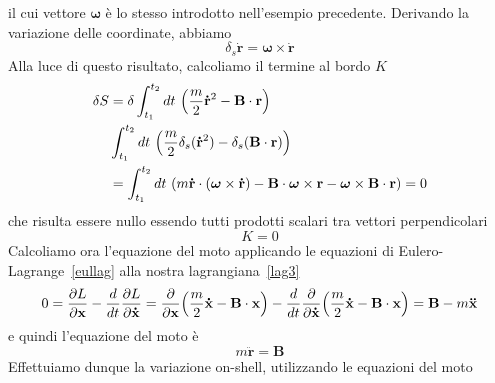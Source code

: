 \begin{example}
\begin{equation}
    \end{equation}
        il cui vettore $\boldsymbol \omega$ è lo stesso introdotto nell'esempio precedente. Derivando la variazione delle coordinate, abbiamo
    \begin{equation}
        \delta_s \mathbf{\dot r} = \boldsymbol \omega \times \mathbf{\dot r}
    \end{equation}
        Alla luce di questo risultato, calcoliamo il termine al bordo $K$ 
    \begin{equation*}
    \begin{aligned}
        \delta S & = \delta \int_{t_1}^{t_2}dt~ \Big( \frac{m}{2} \mathbf{\dot r}^2 - \mathbf B \cdot \mathbf r \Big) \\ & \int_{t_1}^{t_2}dt~ \Big( \frac{m}{2} \delta_s (\mathbf{\dot r}^2) - \delta_s (\mathbf B \cdot \mathbf r ) \Big ) \\ & = \int_{t_1}^{t_2}dt~ (m \mathbf{\dot r} \cdot (\boldsymbol \omega \times \mathbf{\dot r} ) - \mathbf B \cdot \boldsymbol \omega \times \mathbf r - \boldsymbol \omega \times \mathbf B \cdot \mathbf r ) = 0
    \end{aligned}
    \end{equation*}
        che risulta essere nullo essendo tutti prodotti scalari tra vettori perpendicolari
    \begin{equation*}
        K = 0
    \end{equation*}
        Calcoliamo ora l'equazione del moto applicando le equazioni di Eulero-Lagrange~\eqref{eullag} alla nostra lagrangiana~\eqref{lag3}
    \begin{equation*}
        0 = \frac{\partial L}{\partial\mathbf x} - \frac{d}{dt} \frac{\partial L}{\partial\mathbf{\dot x}} = \frac{\partial}{\partial\mathbf x} \Big(\frac{m}{2} \mathbf{\dot x} - \mathbf B \cdot \mathbf x \Big) - \frac{d}{dt} \frac{\partial}{\partial\mathbf{\dot x}} \Big(\frac{m}{2} \mathbf{\dot x} - \mathbf B \cdot \mathbf x \Big) = \mathbf B - m \mathbf{\ddot x}
    \end{equation*}
        e quindi l'equazione del moto è
    \begin{equation}\label{eqmoto3}
        m \mathbf{\ddot r} = \mathbf B
    \end{equation}
        Effettuiamo dunque la variazione on-shell, utilizzando le equazioni del moto
    \begin{equation*}
    \begin{aligned}

\end{aligned}
\end{equation*}
\end{example}
